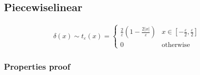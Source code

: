 \documentclass[letterpaper,10pt,english]{jupyterBook}
\begin{document}
\subsection{Piecewise\sphinxhyphen{}linear}
\label{\detokenize{ch/functional-analysis/dirac-delta:piecewise-linear}}\label{\detokenize{ch/functional-analysis/dirac-delta:functional-analysis-dirac-delta-approximations-hat}}\begin{equation*}
\begin{split}\delta(x) \sim t_{\varepsilon}(x) = \begin{cases} \frac{2}{\varepsilon} \left( 1 - \frac{2 |x|}{\varepsilon} \right) & x \in \left[-\frac{\varepsilon}{2}, \frac{\varepsilon}{2} \right] \\ 0 & \text{otherwise} \end{cases}\end{split}
\end{equation*}\subsubsection*{Properties \sphinxhyphen{} proof}
\end{document}

